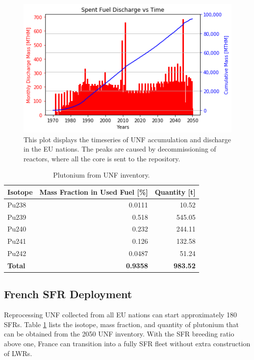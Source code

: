 \begin{figure}[htbp!]
	\begin{center}
			\includegraphics[scale=0.7]{./images/eu_future/snf_discharge.png}
	\end{center}
	\caption{This plot displays the timeseries of \gls{UNF} accumulation and discharge in the \gls{EU} nations.
			 The peaks are caused by decommissioning of reactors, where all the core is sent to the repository.}
	\label{fig:eu_snf}
\end{figure}
\FloatBarrier


\begin{table}[h]
	\centering
	\caption{Plutonium from \gls{UNF} inventory.}
	\begin{tabular}{lrr}
		\hline
		\textbf{Isotope} & \textbf{Mass Fraction in Used Fuel [\%]} & \textbf{Quantity [t]} \\ \hline
		Pu238 & 0.0111 & 10.52 \\ 
		Pu239 & 0.518 & 545.05 \\ 
		Pu240 & 0.232 & 244.11 \\ 
		Pu241 & 0.126 & 132.58 \\ 
		Pu242 & 0.0487 & 51.24 \\ \hline
		\textbf{Total} & \textbf{0.9358} & \textbf{983.52} \\ \hline
	\end{tabular}
	
	\label{tab:pu}
\end{table}



\subsection{French \gls{SFR} Deployment}

Reprocessing \gls{UNF} collected from all EU nations can start approximately
180 \glspl{SFR}. Table \ref{tab:pu} lists the isotope, mass fraction,
and quantity of plutonium that can be obtained from the 2050 \gls{UNF} inventory.
 With the \gls{SFR} breeding ratio above one, France can transition into
a fully \gls{SFR} fleet without extra construction of \glspl{LWR}. 

